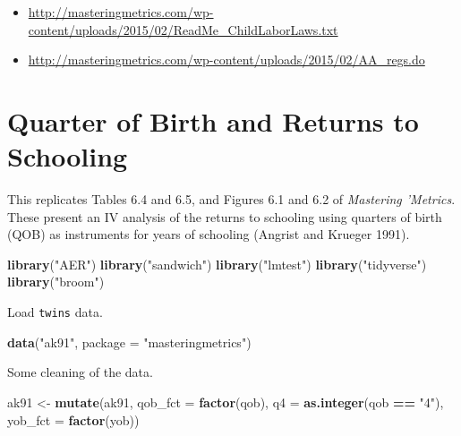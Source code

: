 \documentclass[]{book}
\newenvironment{Shaded}{\begin{snugshade}}{\end{snugshade}}
\newcommand{\DataTypeTok}[1]{\textcolor[rgb]{0.13,0.29,0.53}{#1}}
\newcommand{\KeywordTok}[1]{\textcolor[rgb]{0.13,0.29,0.53}{\textbf{#1}}}
\newcommand{\NormalTok}[1]{#1}
\newcommand{\OperatorTok}[1]{\textcolor[rgb]{0.81,0.36,0.00}{\textbf{#1}}}
\newcommand{\StringTok}[1]{\textcolor[rgb]{0.31,0.60,0.02}{#1}}
\providecommand{\tightlist}{%
  \setlength{\itemsep}{0pt}\setlength{\parskip}{0pt}}
\theoremstyle{definition}
\theoremstyle{definition}
\theoremstyle{definition}
\theoremstyle{remark}
\begin{document}
\begin{itemize}
\tightlist
\item
  \url{http://masteringmetrics.com/wp-content/uploads/2015/02/ReadMe_ChildLaborLaws.txt}
\item
  \url{http://masteringmetrics.com/wp-content/uploads/2015/02/AA_regs.do}
\end{itemize}

\hypertarget{quarter-of-birth-and-returns-to-schooling}{%
\chapter{Quarter of Birth and Returns to
Schooling}\label{quarter-of-birth-and-returns-to-schooling}}

This replicates Tables 6.4 and 6.5, and Figures 6.1 and 6.2 of
\emph{Mastering 'Metrics}. These present an IV analysis of the returns
to schooling using quarters of birth (QOB) as instruments for years of
schooling (Angrist and Krueger 1991).

\begin{Shaded}
\begin{Highlighting}[]
\KeywordTok{library}\NormalTok{(}\StringTok{"AER"}\NormalTok{)}
\KeywordTok{library}\NormalTok{(}\StringTok{"sandwich"}\NormalTok{)}
\KeywordTok{library}\NormalTok{(}\StringTok{"lmtest"}\NormalTok{)}
\KeywordTok{library}\NormalTok{(}\StringTok{"tidyverse"}\NormalTok{)}
\KeywordTok{library}\NormalTok{(}\StringTok{"broom"}\NormalTok{)}
\end{Highlighting}
\end{Shaded}

Load \texttt{twins} data.

\begin{Shaded}
\begin{Highlighting}[]
\KeywordTok{data}\NormalTok{(}\StringTok{"ak91"}\NormalTok{, }\DataTypeTok{package =} \StringTok{"masteringmetrics"}\NormalTok{)}
\end{Highlighting}
\end{Shaded}

Some cleaning of the data.

\begin{Shaded}
\begin{Highlighting}[]
\NormalTok{ak91 <-}\StringTok{ }\KeywordTok{mutate}\NormalTok{(ak91,}
               \DataTypeTok{qob_fct =} \KeywordTok{factor}\NormalTok{(qob),}
               \DataTypeTok{q4 =} \KeywordTok{as.integer}\NormalTok{(qob }\OperatorTok{==}\StringTok{ "4"}\NormalTok{),}
               \DataTypeTok{yob_fct =} \KeywordTok{factor}\NormalTok{(yob))}
\end{Highlighting}
\end{Shaded}
\end{document}

